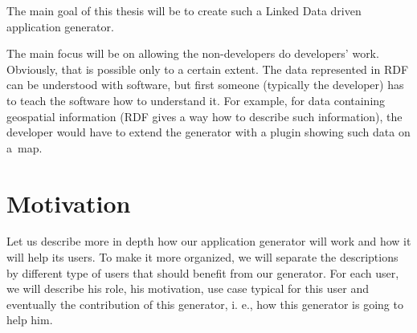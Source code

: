 The main goal of this thesis will be to create such a Linked Data driven application generator.

The main focus will be on allowing the non-developers do developers' work. Obviously, that is possible only to a certain extent. The data represented in RDF can be understood with software, but first someone (typically the developer) has to teach the software how to understand it. For example, for data containing geospatial information (RDF gives a way how to describe such information), the developer would have to extend the generator with a plugin showing such data on a~map.

\section*{Motivation}

Let us describe more in depth how our application generator will work and how it will help its users. To make it more organized, we will separate the descriptions by different type of users that should benefit from our generator. For each user, we will describe his role, his motivation, use case typical for this user and eventually the contribution of this generator, i. e., how this generator is going to help him.

